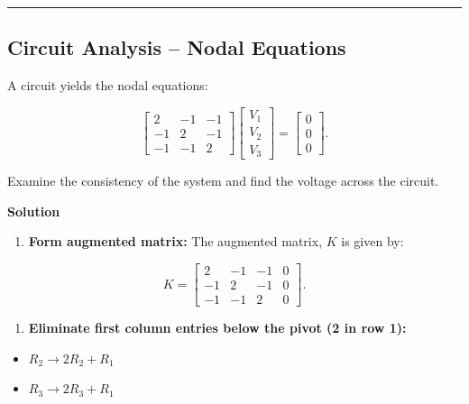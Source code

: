 \documentclass[
  letterpaper,
  DIV=11,
  numbers=noendperiod]{scrreprt}
\providecommand{\tightlist}{%
  \setlength{\itemsep}{0pt}\setlength{\parskip}{0pt}}
\begin{document}
\begin{center}\rule{0.5\linewidth}{0.5pt}\end{center}

\subsection{Circuit Analysis -- Nodal
Equations}\label{circuit-analysis-nodal-equations}

A circuit yields the nodal equations:

\[
\begin{bmatrix}
2 & -1 & -1 \\
-1 & 2 & -1 \\
-1 & -1 & 2
\end{bmatrix}
\begin{bmatrix} V_1 \\ V_2 \\ V_3 \end{bmatrix}
=
\begin{bmatrix} 0 \\ 0 \\ 0 \end{bmatrix}.
\]

Examine the consistency of the system and find the voltage across the
circuit.

\textbf{Solution}

\begin{enumerate}
\def\labelenumi{\arabic{enumi}.}
\tightlist
\item
  \textbf{Form augmented matrix:} The augmented matrix, \(K\) is given
  by:
\end{enumerate}

\[
K=\left[\begin{array}{ccc|c}
2 & -1 & -1 & 0\\
-1 & 2 & -1 & 0\\
-1 & -1 & 2 & 0
\end{array}\right].
\]

\begin{enumerate}
\def\labelenumi{\arabic{enumi}.}
\setcounter{enumi}{1}
\tightlist
\item
  \textbf{Eliminate first column entries below the pivot (2 in row
  1):}\\
\end{enumerate}

\begin{itemize}
\tightlist
\item
  \(R_2 \to 2R_2 + R_1\)\\
\item
  \(R_3 \to 2R_3 + R_1\)
\end{itemize}
\end{document}
